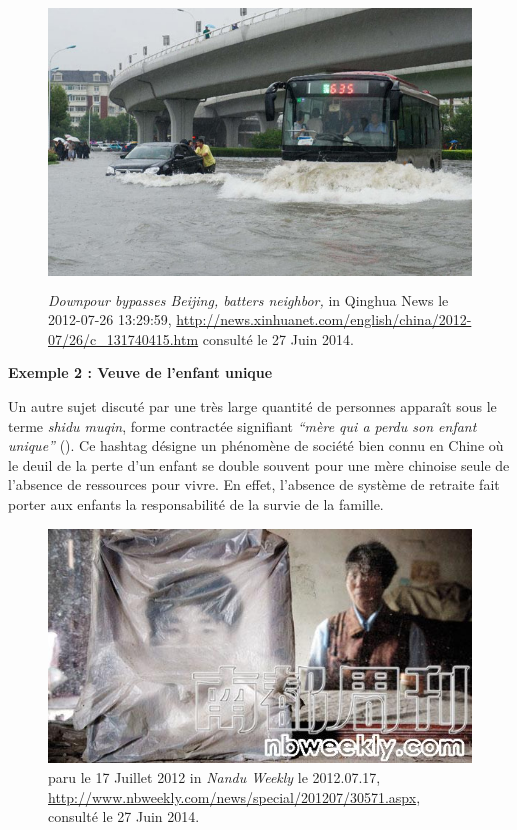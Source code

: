 \begin{figure}[htbp]
    \centering
    \includegraphics[width=4.76in,height=3in]{figures/chap3/chapitre3-img16.jpg}
    \caption[Photo de Tianjin durant la pluie torentielle en Juillet 2012]{\textit{Downpour bypasses Beijing, batters neighbor, }in Qinghua News le 2012-07-26 13:29:59, \url{http://news.xinhuanet.com/english/china/2012-07/26/c_131740415.htm} consulté le 27 Juin 2014.}
\end{figure}

\textbf{Exemple 2 : Veuve de l{\textquoteright}enfant unique}

Un autre sujet discuté par une très large quantité de personnes appara\^it sous le terme {\textquotedbl}\textit{shidu muqin}{\textquotedbl}, forme contractée signifiant \textit{{\textquotedblleft}mère qui a perdu son enfant unique{\textquotedblright}} (). Ce hashtag désigne un phénomène de société bien connu en Chine o\`u le deuil de la perte d{\textquoteright}un enfant se double souvent pour une mère chinoise seule de l{\textquoteright}absence de ressources pour vivre. En effet, l{\textquoteright}absence de système de retraite fait porter aux enfants la responsabilité de la survie de la famille.

\begin{figure}[htbp]
    \centering
    \includegraphics[scale=0.7]{figures/chap3/chapitre3-shidumuqin.jpg}
    \caption[Photo illustrative de Shidu Muqin]{ paru le 17 Juillet 2012 in \textit{Nandu Weekly} le 2012.07.17, \url{http://www.nbweekly.com/news/special/201207/30571.aspx}, consulté le 27 Juin 2014.}
    \label{fig:photo-shidumuqin}
\end{figure}


